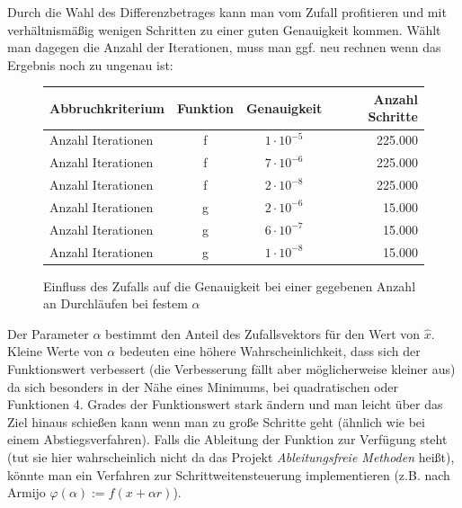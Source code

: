 \documentclass[a4paper, 12pt]{report}
\begin{document}
Durch die Wahl des Differenzbetrages kann man vom Zufall profitieren und mit verhältnismäßig wenigen Schritten zu einer guten Genauigkeit kommen.
Wählt man dagegen die Anzahl der Iterationen, muss man ggf. neu rechnen wenn das Ergebnis noch zu ungenau ist:

\begin{figure}[H]
  \centering
  \def\arraystretch{1.25}
  \begin{tabular}{l|c|c|r}
    \hline
    \textbf{Abbruchkriterium} & \textbf{Funktion} & \textbf{Genauigkeit} & \textbf{Anzahl Schritte}\\
    \hline
    Anzahl Iterationen & f & $1\cdot 10^{-5}$ & 225.000\\
    Anzahl Iterationen & f & $7\cdot 10^{-6}$ & 225.000\\
    Anzahl Iterationen & f & $2\cdot 10^{-8}$ & 225.000\\
    Anzahl Iterationen & g & $2\cdot 10^{-6}$ & 15.000\\
    Anzahl Iterationen & g & $6\cdot 10^{-7}$ & 15.000\\
    Anzahl Iterationen & g & $1\cdot 10^{-8}$ & 15.000\\
    \hline
  \end{tabular}
  \caption{Einfluss des Zufalls auf die Genauigkeit bei einer gegebenen Anzahl an Durchläufen bei festem $\alpha$}
\end{figure}

Der Parameter $\alpha$ bestimmt den Anteil des Zufallsvektors für den Wert von $\hat x$. Kleine Werte von $\alpha$ bedeuten eine höhere Wahrscheinlichkeit,
dass sich der Funktionswert verbessert (die Verbesserung fällt aber möglicherweise kleiner aus) da sich besonders in der Nähe eines Minimums,
bei quadratischen oder Funktionen 4. Grades der Funktionswert stark ändern und man leicht über das Ziel hinaus schießen kann wenn man zu große
Schritte geht (ähnlich wie bei einem Abstiegsverfahren). Falls die Ableitung der Funktion zur Verfügung steht (tut sie hier wahrscheinlich nicht da
das Projekt \textit{Ableitungsfreie Methoden} heißt), könnte man ein Verfahren zur Schrittweitensteuerung implementieren
(z.B. nach Armijo $\varphi(\alpha) := f(x + \alpha r)$).\par
\end{document}
